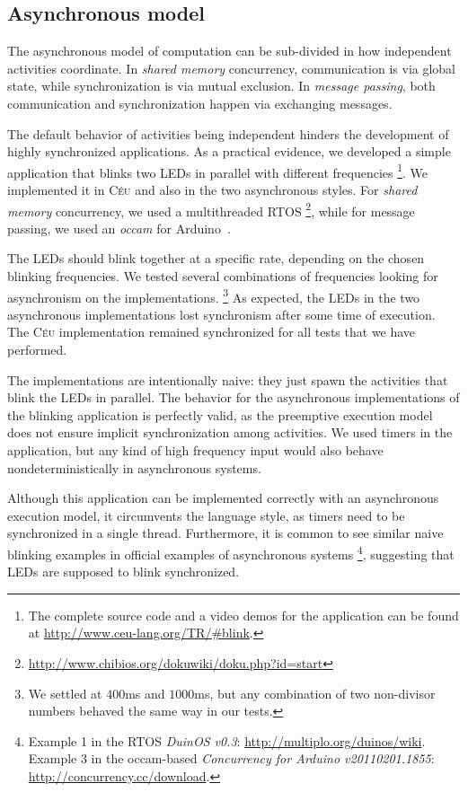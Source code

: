 \documentclass[11pt,a4paper]{article}
\newcommand{\2}{\;\;}
\newcommand{\5}{\;\;\;\;\;}
\newcommand{\CEU}{\textsc{C\'{e}u}}
\begin{document}
\subsection{Asynchronous model}

The asynchronous model of computation can be sub-divided in how independent 
activities coordinate.
In \emph{shared memory} concurrency, communication is via global state, while 
synchronization is via mutual exclusion.
In \emph{message passing}, both communication and synchronization happen via 
exchanging messages.

The default behavior of activities being independent hinders the development of 
highly synchronized applications.
As a practical evidence, we developed a simple application that blinks two LEDs 
in parallel with different frequencies%
\footnote{The complete source code and a video demos for the application can be 
found at \url{http://www.ceu-lang.org/TR/\#blink}.}.
We implemented it in \CEU{} and also in the two asynchronous styles.
For \emph{shared memory} concurrency, we used a multithreaded RTOS%
\footnote{\url{http://www.chibios.org/dokuwiki/doku.php?id=start}}, while for 
message passing, we used an \emph{occam} for Arduino~\cite{arduino.occam}.

The LEDs should blink together at a specific rate, depending on the chosen 
blinking frequencies.
We tested several combinations of frequencies looking for asynchronism on the 
implementations.%
\footnote{We settled at $400$ms and $1000$ms, but any combination of two 
non-divisor numbers behaved the same way in our tests.}
As expected, the LEDs in the two asynchronous implementations lost synchronism 
after some time of execution.
The \CEU{} implementation remained synchronized for all tests that we have 
performed.

The implementations are intentionally naive: they just spawn the activities 
that blink the LEDs in parallel.
The behavior for the asynchronous implementations of the blinking application 
is perfectly valid, as the preemptive execution model does not ensure implicit 
synchronization among activities.
We used timers in the application, but any kind of high frequency input would 
also behave nondeterministically in asynchronous systems.

Although this application can be implemented correctly with an asynchronous 
execution model, it circumvents the language style, as timers need to be 
synchronized in a single thread.
Furthermore, it is common to see similar naive blinking examples in official 
examples of asynchronous systems%
\footnote{
Example 1 in the RTOS \emph{DuinOS v0.3}:
\url{http://multiplo.org/duinos/wiki}.\\
Example 3 in the occam-based \emph{Concurrency for Arduino v20110201.1855}:
\url{http://concurrency.cc/download}.
}, suggesting that LEDs are supposed to blink synchronized.
\end{document}
